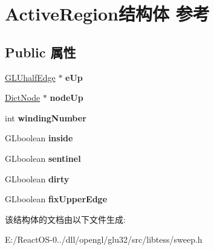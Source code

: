 \hypertarget{struct_active_region}{}\section{Active\+Region结构体 参考}
\label{struct_active_region}
\subsection*{Public 属性}
\begin{DoxyCompactItemize}
\item 
\mbox{\label{struct_active_region_a5c9f1db6fc71ce7b72b72ddfede514f8}} 
\hyperlink{struct_g_l_uhalf_edge}{G\+L\+Uhalf\+Edge} $\ast$ {\bfseries e\+Up}
\item 
\mbox{\label{struct_active_region_a1b17b9f4ff20a2f5681ebcd6dac24866}} 
\hyperlink{struct_dict_node}{Dict\+Node} $\ast$ {\bfseries node\+Up}
\item 
\mbox{\label{struct_active_region_a749678645d10dea2db65e024d125bfb5}} 
int {\bfseries winding\+Number}
\item 
\mbox{\label{struct_active_region_ab0b4c16344e84113c756adf22a3da98e}} 
G\+Lboolean {\bfseries inside}
\item 
\mbox{\label{struct_active_region_af1ba5a0445c51b59f63430c678de9500}} 
G\+Lboolean {\bfseries sentinel}
\item 
\mbox{\label{struct_active_region_a34f33cc94874bc7bddf6fa12b0b622dd}} 
G\+Lboolean {\bfseries dirty}
\item 
\mbox{\label{struct_active_region_a15c6c0aca36f716b09b8d7d53b0a9fe4}} 
G\+Lboolean {\bfseries fix\+Upper\+Edge}
\end{DoxyCompactItemize}


该结构体的文档由以下文件生成\+:\begin{DoxyCompactItemize}
\item 
E\+:/\+React\+O\+S-\/0../dll/opengl/glu32/src/libtess/sweep.\+h\end{DoxyCompactItemize}
